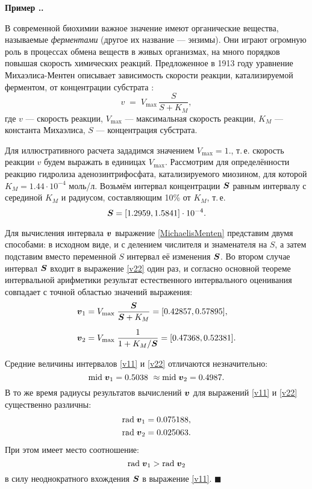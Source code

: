 \documentclass[a5paper,openany]{book}
\newcommand{\mbf}[1]{\protect\text{\boldmath$#1$}}
\newcommand{\m}{\mathrm{mid}\;}
\renewcommand{\r}{\mathrm{rad}\;}
\newcounter{ExmpNum}[section]
\renewcommand{\theExmpNum}{\thesection.\arabic{ExmpNum}}
\newenvironment{example}%
  {\refstepcounter{ExmpNum}%
  \par\addvspace{\medskipamount} 
  \noindent\textbf{Пример {\theExmpNum}.}
  }%
  {\hfill$\blacksquare$\par\medskip}
\begin{document}
\begin{example} 
В современной биохимии важное значение имеют органические вещества, называемые  \textit{ферментами} (другое их название ---  энзимы). Они играют огромную роль 
в процессах обмена веществ в живых организмах, на много порядков повышая скорость 
химических реакций. Предложенное в 1913 году уравнение Михаэлиса-Ментен описывает 
зависимость скорости реакции, катализируемой ферментом, от концентрации субстрата 
\cite{Biokhimiya}: 
\begin{equation} 
\label{MichaelisMenten} 
v \; = \; V_{\max}\, \frac{S}{S+K_M},
\end{equation}
где $v$ --- скорость реакции, $V_{\max} $ --- максимальная скорость реакции, 
$K_M$ --- константа Михаэлиса, $S$ ---  концентрация субстрата. 

Для иллюстративного расчета зададимся значением $V_{\max} =  1.$, т.\,е. скорость 
реакции $v$ будем выражать в единицах  $V_{\max}$. Рассмотрим для определённости 
реакцию гидролиза аденозинтрифосфата, катализируемого миозином, для которой 
$K_M = 1.44 \cdot 10^{-4} $ моль/л. Возьмём интервал концентрации $\mbf{S}$ равным 
интервалу с серединой $K_M$ и радиусом, составляющим 10\% от $K_M$, т.\,е. 
\begin{equation*} 
\mbf{S} = [1.2959, 1.5841] \cdot 10^{-4}. 
\end{equation*} 
   
Для вычисления интервала $\mbf{v}$ выражение \eqref{MichaelisMenten} представим двумя 
способами: в исходном виде, и с делением числителя и знаменателя на $S$, а затем 
подставим вместо переменной $S$ интервал её изменения $\mbf{S}$. Во втором 
случае интервал $\mbf{S}$ входит в выражение \eqref{v22} один раз, и согласно 
основной теореме интервальной арифметики результат естественного интервального 
оценивания совпадает с точной областью значений выражения: 
\begin{align}
\mbf{v}_1 &= V_{\max}\;\frac{\mbf{S}}{\mbf{S}+K_M} = [0.42857, 0.57895], \label{v11}\\[2mm] 
\mbf{v}_2 &= V_{\max}\;\frac{1}{1+K_M/\mbf{S}} = [0.47368, 0.52381]. \label{v22}
\end{align} 
  
Средние величины интервалов \eqref{v11} и \eqref{v22} отличаются незначительно: 
\begin{equation*} 
\m \mbf{v}_1 =  0.5038  \   \approx \m \mbf{v}_2 =  0.4987. 
\end{equation*} 
В то же время радиусы результатов вычислений $ \mbf{v}$ для выражений \eqref{v11} 
и \eqref{v22} существенно различны: 
\begin{align*}
\r \mbf{v}_1 &=  0.075188, \\
\r \mbf{v}_2 &= 0.025063.
\end{align*} 
При этом имеет место соотношение:
\begin{equation*} 
\r \mbf{v}_1 > \r \mbf{v}_2
\end{equation*} 
в силу неоднократного вхождения $\mbf{S}$ в выражение \eqref{v11}. 
\end{example} 
  
\end{document}
